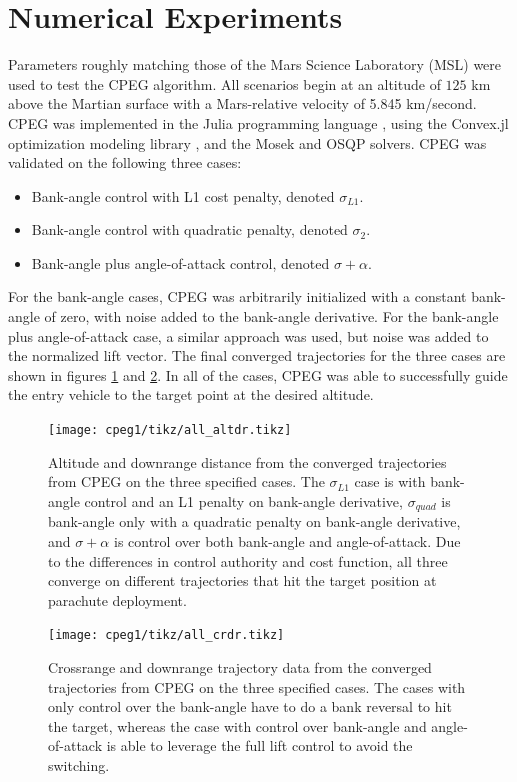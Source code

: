 \section{Numerical Experiments}
 \label{sec:cpeg1:experiments}
Parameters roughly matching those of the Mars Science Laboratory (MSL) \cite{mendeck2014} were used to test the CPEG algorithm. All scenarios begin at an altitude of $125$ km above the Martian surface with a Mars-relative velocity of 5.845 km/second. CPEG was implemented in the Julia programming language \cite{bezanson2017}, using the Convex.jl optimization modeling library \cite{udell2014}, and the Mosek \cite{mosekaps2014} and OSQP \cite{stellato} solvers. CPEG was validated on the following three cases:
\begin{itemize}
    \item Bank-angle control with L1 cost penalty, denoted $\sigma_{L1}$.
    \vspace{+2mm}
    \item Bank-angle control with quadratic penalty, denoted $\sigma_{2}$.
    \vspace{+2mm}
    \item Bank-angle plus angle-of-attack control, denoted $\sigma + \alpha$.
\end{itemize}
For the bank-angle cases, CPEG was arbitrarily initialized with a constant bank-angle of zero, with noise added to the bank-angle derivative. For the bank-angle plus angle-of-attack case, a similar approach was used, but noise was added to the normalized lift vector. The final converged trajectories for the three cases are shown in figures \ref{fig:allalt} and \ref{fig:allcrdr}. In all of the cases, CPEG was able to successfully guide the entry vehicle to the target point at the desired altitude.
\begin{figure}
    \centering
    \texttt{[image: cpeg1/tikz/all\_altdr.tikz]}
    \caption{Altitude and downrange distance from the converged trajectories from CPEG on the three specified cases. The $\sigma_{L1}$ case is with bank-angle control and an L1 penalty on bank-angle derivative, $\sigma_{quad}$ is bank-angle only with a quadratic penalty on bank-angle derivative, and $\sigma + \alpha$ is control over both bank-angle and angle-of-attack. Due to the differences in control authority and cost function, all three converge on different trajectories that hit the target position at parachute deployment.}
    \label{fig:allalt}
\end{figure}
\begin{figure}
    \centering
    \texttt{[image: cpeg1/tikz/all\_crdr.tikz]}
    \caption{Crossrange and downrange trajectory data from the converged trajectories from CPEG on the three specified cases. The cases with only control over the bank-angle have to do a bank reversal to hit the target, whereas the case with control over bank-angle and angle-of-attack is able to leverage the full lift control to avoid the switching.}
    \label{fig:allcrdr}
\end{figure}
